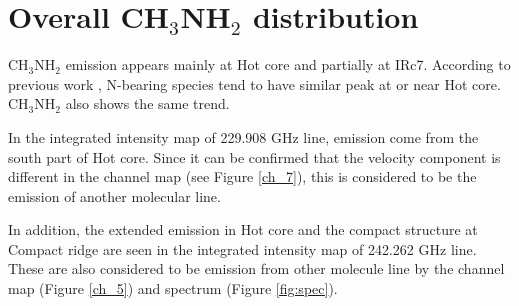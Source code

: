 \section{Overall CH$_3$NH$_2$ distribution}
CH$_3$NH$_2$ emission appears mainly at Hot core and partially at IRc7.
According to previous work \citep[see e.g.,][]{Feng+2015, Gong+2015}, N-bearing species tend to have 
similar peak at or near Hot core.  CH$_3$NH$_2$ also shows the same trend.

In the integrated intensity map of 229.908 GHz line, emission come from the south part of Hot core.
Since it can be confirmed that the velocity component is different in the channel map (see Figure \ref{ch_7}), 
this is considered to be the emission of another molecular line.

In addition, the extended emission in Hot core and the compact structure at Compact ridge are seen 
in the integrated intensity map of 242.262 GHz line. These are also considered to be emission from other molecule line 
by the channel map (Figure \ref{ch_5}) and spectrum (Figure \ref{fig:spec}).

